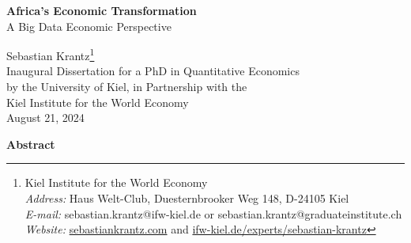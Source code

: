 \documentclass[openany]{book}
\begin{document}
\begin{titlepage}
    \vspace*{\fill}
    \begin{center}
        \Huge\textbf{Africa's Economic Transformation}\\A Big Data Economic Perspective
        
        \vspace{1cm}
        \Large Sebastian Krantz\footnote{Kiel Institute for the World Economy\\ \textit{Address:} Haus Welt-Club, Duesternbrooker Weg 148, D-24105 Kiel\\ \textit{E-mail:} sebastian.krantz@ifw-kiel.de or sebastian.krantz@graduateinstitute.ch\\ \textit{Website:} \href{https://sebastiankrantz.com}{sebastiankrantz.com} and \href{https://www.ifw-kiel.de/experts/sebastian-krantz/}{ifw-kiel.de/experts/sebastian-krantz}}\\[1em]Inaugural Dissertation for a PhD in Quantitative Economics\\by the University of Kiel, in Partnership with the\\Kiel Institute for the World Economy
\\[1em]August 21, 2024
        
        
        \vspace{2cm} %
        \large \textbf{Abstract}
        

\end{center}
\end{titlepage}
\end{document}
